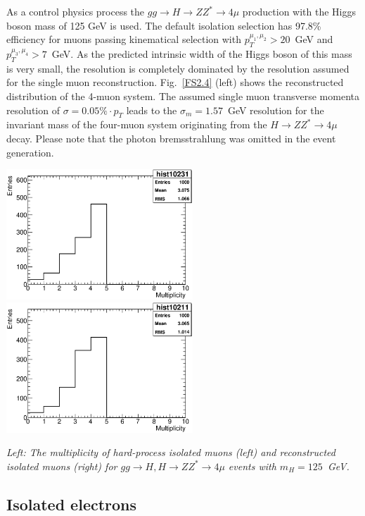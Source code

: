 As a control physics process  the
 $gg \to H \to ZZ^* \to 4 \mu $ production with the 
Higgs boson mass of 125 GeV is used. The default
isolation selection has 97.8\% efficiency for muons passing kinematical selection  with 
$p_T^{\mu_1, \mu_2} > 20$~GeV and $p_T^{\mu_3, \mu_4} > 7$~GeV. 
As the predicted intrinsic width
of the Higgs boson of this mass is very small, the resolution is
completely dominated by the resolution assumed for the 
single muon reconstruction. Fig.~\ref{FS2.4} (left) shows the
reconstructed distribution of the 4-muon system.
The assumed single muon transverse momenta resolution
 of $\sigma = 0.05\% \cdot p_T$
leads to the $\sigma_m = 1.57$~GeV resolution for the invariant mass
of the four-muon system originating from the $ H \to ZZ^* \to 4 \mu $
decay. Please note that the photon bremsstrahlung
was omitted in the event generation.



\begin{Fighere}
\begin{center}
   \includegraphics[width=7.0cm,angle=0]{plot-HPisolMuons.eps}
   \includegraphics[width=7.0cm,angle=0]{plot-recoMuons.eps}
\end{center}
\caption{\em
Left: The multiplicity of  hard-process isolated muons (left) and reconstructed isolated muons (right) 
for $gg \to H, H \to ZZ^* \to 4\mu$ events with $m_H=125$~GeV.
\label{FS2.4}} 
\end{Fighere}


\boldmath 
\subsection{Isolated electrons}
\unboldmath

